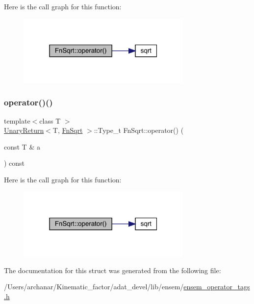 Here is the call graph for this function\+:
\nopagebreak
\begin{figure}[H]
\begin{center}
\leavevmode
\includegraphics[width=244pt]{d0/d4d/structFnSqrt_a019bed3e40dc318937e7655b3e4222bb_cgraph}
\end{center}
\end{figure}
\mbox{\label{structFnSqrt_a019bed3e40dc318937e7655b3e4222bb}} 
\subsubsection{\texorpdfstring{operator()()}{operator()()}\hspace{0.1cm}{\footnotesize\ttfamily [2/2]}}
{\footnotesize\ttfamily template$<$class T $>$ \\
\mbox{\hyperlink{structUnaryReturn}{Unary\+Return}}$<$T, \mbox{\hyperlink{structFnSqrt}{Fn\+Sqrt}} $>$\+::Type\+\_\+t Fn\+Sqrt\+::operator() (\begin{DoxyParamCaption}\item[{const T \&}]{a }\end{DoxyParamCaption}) const\hspace{0.3cm}{\ttfamily [inline]}}

Here is the call graph for this function\+:
\nopagebreak
\begin{figure}[H]
\begin{center}
\leavevmode
\includegraphics[width=244pt]{d0/d4d/structFnSqrt_a019bed3e40dc318937e7655b3e4222bb_cgraph}
\end{center}
\end{figure}


The documentation for this struct was generated from the following file\+:\begin{DoxyCompactItemize}
\item 
/\+Users/archanar/\+Kinematic\+\_\+factor/adat\+\_\+devel/lib/ensem/\mbox{\hyperlink{lib_2ensem_2ensem__operator__tags_8h}{ensem\+\_\+operator\+\_\+tags.\+h}}\end{DoxyCompactItemize}
